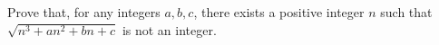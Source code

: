 Prove that, for any integers $a, b, c$, there exists a positive integer
$n$ such that $\sqrt{n^3+an^2+bn+c}$ is not an integer.

